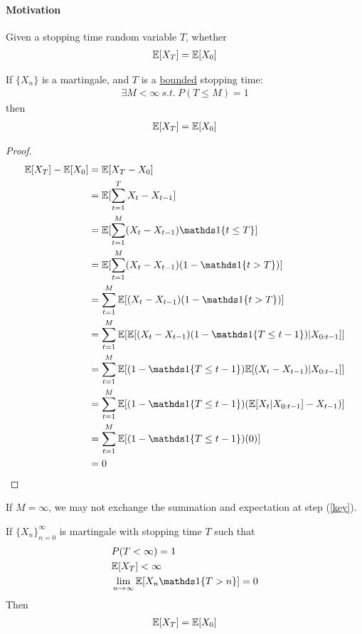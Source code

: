 \documentclass{article}
\begin{document}
	\paragraph{Motivation} Given a stopping time random variable $T$, whether
	\begin{align}
		\mathbb{E}[{X_T}] = \mathbb{E}[{X_0}]
	\end{align}
	
	\begin{lemma}
		If $\{X_n\}$ is a martingale, and $T$ is a \ul{bounded} stopping time:
		\begin{align}
			\exists M < \infty\ s.t.\ P(T \leq M) = 1
		\end{align}
		then
		\begin{align}
			\mathbb{E}[{X_T}] = \mathbb{E}[{X_0}]
		\end{align}
	\end{lemma}
	
	\begin{proof}
		\begin{align}
			\expect{X_T} - \expect{X_0}
			&= \expect{X_T - X_0} \\
			&= \expect{\sum_{t=1}^T X_t - X_{t-1}} \\
			&= \expect{\sum_{t=1}^M (X_t - X_{t-1}) \id{t \leq T}} \\
			&= \expect{\sum_{t=1}^M (X_t - X_{t-1}) (1 - \id{t > T})} \\
			&= \sum_{t=1}^M \expect{(X_t - X_{t-1}) (1 - \id{t > T})} \label{key}\\
			&= \sum_{t=1}^M \expect{\expect{(X_t - X_{t-1}) (1 - \id{T \leq t-1})|X_{0:t-1}}} \\
			&= \sum_{t=1}^M \expect{(1 - \id{T \leq t-1}) \expect{(X_t - X_{t-1})|X_{0:t-1}}} \\
			&= \sum_{t=1}^M \expect{(1 - \id{T \leq t-1}) (\expect{X_t|X_{0:t-1}} - X_{t-1})} \\
			&= \sum_{t=1}^M \expect{(1 - \id{T \leq t-1}) (0)} \\
			&= 0
		\end{align}
	\end{proof}
	
	\begin{remark}
		If $M = \infty$, we may not exchange the summation and expectation at step (\ref{key}).
	\end{remark}
	
	\begin{theorem}
		If $\{X_n\}_{n=0}^\infty$ is martingale with stopping time $T$ such that
		\begin{align}
			&P(T < \infty) = 1 \label{ost:con1}\\
			&\expect{X_T} < \infty \label{ost:con2}\\
			&\lim_{n \to \infty} \expect{X_n \id{T > n}} = 0 \label{ost:con3}
		\end{align}
		Then
		\begin{align}
			\mathbb{E}[{X_T}] = \mathbb{E}[{X_0}]
		\end{align}
	\end{theorem}
	
\end{document}
